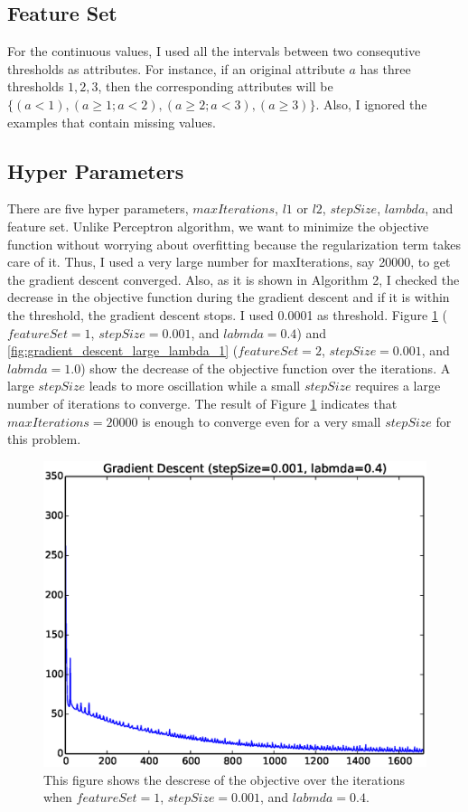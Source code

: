 \subsection*{Feature Set}
For the continuous values, I used all the intervals between two consequtive thresholds as attributes. For instance, if an original attribute $a$ has three thresholds ${1, 2, 3}$, then the corresponding attributes will be $\{(a<1),(a\ge 1; a<2),(a\ge 2; a<3),(a\ge 3)\}$. Also, I ignored the examples that contain missing values.

\subsection*{Hyper Parameters}
There are five hyper parameters, $maxIterations$, $l1$ or $l2$, $stepSize$, $lambda$, and feature set. Unlike Perceptron algorithm, we want to minimize the objective function without worrying about overfitting because the regularization term takes care of it. Thus, I used a very large number for maxIterations, say 20000, to get the gradient descent converged. Also, as it is shown in Algorithm 2, I checked the decrease in the objective function during the gradient descent and if it is within the threshold, the gradient descent stops. I used 0.0001 as threshold. Figure \ref{fig:gradient_descent} ($featureSet=1$, $stepSize=0.001$, and $labmda=0.4$) and \ref{fig:gradient_descent_large_lambda_1} ($featureSet=2$, $stepSize=0.001$, and $labmda=1.0$) show the decrease of the objective function over the iterations. A large $stepSize$ leads to more oscillation while a small $stepSize$ requires a large number of iterations to converge. The result of Figure \ref{fig:gradient_descent} indicates that $maxIterations=20000$ is enough to converge even for a very small $stepSize$ for this problem.

\begin{figure}[hbtp]
\centering
\includegraphics[width=120mm]{gradient_descent}
\caption{This figure shows the descrese of the objective over the iterations when $featureSet=1$, $stepSize=0.001$, and $labmda=0.4$.}
\label{fig:gradient_descent}
\end{figure}

